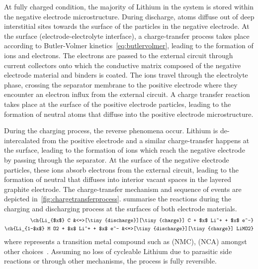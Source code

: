 At fully  charged condition,  the majority  of Lithium in  the system  is stored
within  the  negative  electrode  microstructure.  During  discharge,  
atoms  diffuse  out of  deep  interstitial  sites  towards  the surface  of  the
particles  in  the negative  electrode.  At  the surface  (electrode-electrolyte
interface),  a charge-transfer  process takes  place according  to Butler-Volmer
kinetics~\cref{eq:butlervolmer}, leading to the  formation of  ions and
electrons.  The electrons  are passed  to the  external circuit  through 
current collectors  onto which  the conductive matrix  composed of  the negative
electrode material and binders is coated.  The  ions travel through the
electrolyte phase,  crossing the  separator membrane  to the  positive electrode
where they  encounter an  electron influx  from the  external circuit.  A charge
transfer  reaction  takes  place  at  the  surface  of  the  positive  electrode
particles, leading to the formation of neutral  atoms that diffuse into
the positive electrode microstructure.

During  the   charging  process,  the   reverse  phenomena  occur.   Lithium  is
de-intercalated  from  the  positive  electrode and  a  similar  charge-transfer
happens  at the  surface,  leading  to the  formation  of   ions  which
reach  the  negative  electrode  by   passing  through  the  separator.  At  the
surface  of  the  negative  electrode particles,  these  ions  absorb  electrons
from  the  external circuit,  leading  to  the  formation of  neutral  
that   diffuses  into   interior   vacant  spaces   in   the  layered   graphite
electrode. The  charge-transfer mechanism  and sequence  of events  are depicted
in~\cref{fig:chargetransferprocess}.
 summarise the reactions during the
charging and discharging process at the surfaces of both electrode materials.
\begin{align}
    \ch{Li_{$x$} C                            &<=>[\tiny{discharge}][\tiny{charge}] C + $x$ Li^+ + $x$ e^-}\label{eq:NegElectrodeRxn}\\
    \ch{Li_{1-$x$} M O2 + $x$ Li^+  + $x$ e^- &<=>[\tiny{discharge}][\tiny{charge}] LiMO2}\label{eq:PosElectrodeRxn}
\end{align}
where       represents    a    transition   metal    compound   such    as
   (NMC),      (NCA)
amongst other  choices~\cite{Reddy2011}. Assuming  no loss of  cycleable Lithium
due to  parasitic side  reactions or  through other  mechanisms, the  process is
fully reversible.


